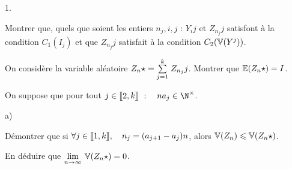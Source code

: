 \documentclass[11pt]{article}%
\begin{document}
\begin{noliste}{1.}
 \setlength{\itemsep}{4mm}
\item Montrer que, quels que soient les entiers $n_{j},i,j$ :\quad
$Y_{i}{j}
$ et $Z_{n_{j}}{j}$ satisfont à la condition $C_{1}(I_{j})$ et que
$Z_{n_{j}}{j}$ satisfait à la condition $C_{2}(\mathbb{V}(Y^{j}))$.

\item On considère la variable aléatoire $Z_{n}{\star
} = {\textstyle\sum\limits_{j = 1}^{k}}\hspace{.1cm}Z_{n_{j}}{j}$. Montrer que $\mathbb{E}(Z_{n}{\star }) = I$.

\item On suppose que pour tout $j\in \lbrack
\hspace{-0.15em}[2,k]\hspace{-0.13em}]\ :\quad na_{j}\in \N^{\times }$.

\begin{noliste}{a)}
 \setlength{\itemsep}{2mm}
\item Démontrer que si $\forall j\in \lbrack
\hspace{-0.15em}[1,k]\hspace{-0.13em}],\quad n_{j} = (a_{j +
1}-a_{j})n$, alors $\mathbb{V}(Z_{n})\leqslant
\mathbb{V}(Z_{n}{\star })$.

\item En déduire que ${\displaystyle \lim_{n\rightarrow \infty } \ }\mathbb{V}(Z_{n}{\star }) =
0$.
\end{noliste}
\end{noliste}

\label{fin}
\end{document}
